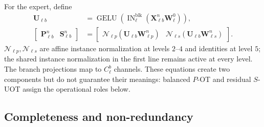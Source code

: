 \documentclass[10pt]{article}
\newcommand{\IN}{\operatorname{IN}}
\newcommand{\GELU}{\operatorname{GELU}}
\begin{document}
For the expert, define
\begin{equation}
\boxed{
\begin{aligned}
 \bm U_{\ell b}
 &=\GELU\!\left(
   \IN_{\ell}^{\mathrm{blk}}
   (\bm X_{\ell b}^n\bm W_\ell^0)\right),\\
 \begin{bmatrix}\bm P_{\ell b}^n&\bm S_{\ell b}^n\end{bmatrix}
 &=
 \begin{bmatrix}
  \mathcal N_{\ell p}(\bm U_{\ell b}\bm W_{\ell p}^n)&
  \mathcal N_{\ell s}(\bm U_{\ell b}\bm W_{\ell s}^n)
 \end{bmatrix}.
\end{aligned}}
\label{eq:expert-factor}
\end{equation}
$\mathcal N_{\ell p},\mathcal N_{\ell s}$ are affine instance normalization at
levels $2$--$4$ and identities at level $5$; the shared instance normalization
in the first line remains active at every level.  The branch projections map
to $C_\ell^b$ channels.  These equations create two components but do not
guarantee their meanings: balanced $P$-OT and residual $S$-UOT assign the
operational roles below.

\subsection{Completeness and non-redundancy}
\end{document}
